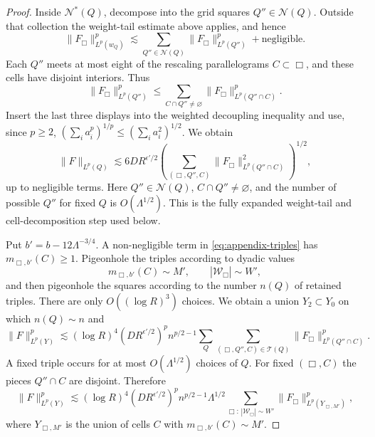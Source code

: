\documentclass[11pt,letterpaper]{amsart}
\begin{document}
\begin{proof}
Inside $\mathcal N^*(Q)$, decompose into the grid squares
$Q''\in\mathcal N(Q)$.  Outside that collection the weight-tail estimate
above applies, and hence
\[
 \|F_\Box\|_{L^p(w_Q)}^p
 \lesssim\sum_{Q''\in\mathcal N(Q)}
       \|F_\Box\|_{L^p(Q'')}^p+\text{negligible}.
\]
Each $Q''$ meets at most eight of the rescaling parallelograms
$C\subset\Box$, and these cells have disjoint interiors.  Thus
\[
 \|F_\Box\|_{L^p(Q'')}^p
 \le\sum_{C\cap Q''\ne\varnothing}
       \|F_\Box\|_{L^p(Q''\cap C)}^p.
\]
Insert the last three displays into the weighted decoupling inequality and
use, since $p\ge2$,
$(\sum_i a_i^p)^{1/p}\le(\sum_i a_i^2)^{1/2}$.  We obtain
\begin{equation}\label{eq:appendix-triples}
 \|F\|_{L^p(Q)}
 \lesssim 6D R^{\epsilon'/2}
 \left(
  \sum_{(\Box,Q'',C)}
  \|F_\Box\|_{L^p(Q''\cap C)}^2
 \right)^{1/2},
\end{equation}
up to negligible terms.  Here $Q''\in\mathcal N(Q)$,
$C\cap Q''\ne\varnothing$, and the number of possible $Q''$ for fixed $Q$
is $O(\Lambda^{1/2})$.  This is the fully expanded weight-tail and
cell-decomposition step used below.

Put $b'=b-12\Lambda^{-3/4}$.  A non-negligible term in
\eqref{eq:appendix-triples} has $m_{\Box,b'}(C)\ge1$.  Pigeonhole the triples
according to dyadic values
\[
 m_{\Box,b'}(C)\sim M',\qquad |\mathcal W_\Box|\sim W',
\]
and then pigeonhole the squares according to the number
$n(Q)$ of retained triples.  There are only $O((\log R)^3)$ choices.  We
obtain a union $Y_2\subset Y_0$ on which $n(Q)\sim n$ and
\begin{equation}\label{eq:appendix-pigeonholed}
 \|F\|_{L^p(Y)}^p
 \lesssim (\log R)^4
 (D R^{\epsilon'/2})^p n^{p/2-1}
 \sum_Q\sum_{(\Box,Q'',C)\in\mathcal T(Q)}
 \|F_\Box\|_{L^p(Q''\cap C)}^p.
\end{equation}
A fixed triple occurs for at most $O(\Lambda^{1/2})$ choices of $Q$.  For
fixed $(\Box,C)$ the pieces $Q''\cap C$ are disjoint.  Therefore
\begin{equation}\label{eq:appendix-summed-triples}
 \|F\|_{L^p(Y)}^p
 \lesssim (\log R)^4(DR^{\epsilon'/2})^p
 n^{p/2-1}\Lambda^{1/2}
 \sum_{\Box:\,|\mathcal W_\Box|\sim W'}
 \|F_\Box\|_{L^p(Y_{\Box,M'})}^p,
\end{equation}
where $Y_{\Box,M'}$ is the union of cells $C$ with
$m_{\Box,b'}(C)\sim M'$.


\end{proof}
\end{document}
